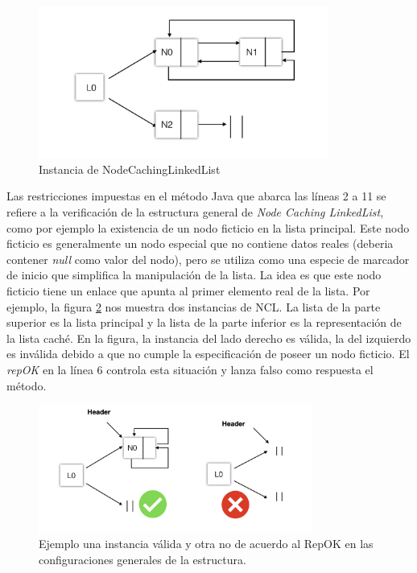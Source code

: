 \begin{figure}[H]
    \centering
    \includegraphics[width=0.85\textwidth]{NCL.jpg}
    \caption{Instancia de NodeCachingLinkedList}
    \label{fig:nclInstanceRepOK}
\end{figure}
Las restricciones impuestas en el método Java que abarca las líneas 2 a 11 se refiere a la verificación de la estructura general de \emph{Node Caching LinkedList}, como por ejemplo la existencia de un nodo ficticio en la lista principal. Este nodo ficticio es generalmente un nodo especial que no contiene datos reales (deberia contener \emph{null} como valor del nodo), pero se utiliza como una especie de marcador de inicio que simplifica la manipulación de la lista. La idea es que este nodo ficticio tiene un enlace que apunta al primer elemento real de la lista. Por ejemplo, la figura \ref{fig:repOK1} nos muestra dos instancias de NCL. La lista de la parte superior es la lista principal y la lista de la parte inferior es la representación de la lista caché.  En la figura, la instancia del lado derecho es válida, la del izquierdo es inválida debido a que no cumple la especificación de poseer un nodo ficticio. El \emph{repOK} en la línea 6 controla esta situación y lanza falso como respuesta el método.

\begin{figure}
  \centering
  \includegraphics[width=0.8\textwidth]{images/repok1.jpg}
  \caption{Ejemplo una instancia válida y otra no de acuerdo al RepOK en las configuraciones generales de la estructura.}
  \label{fig:repOK1}
\end{figure}

